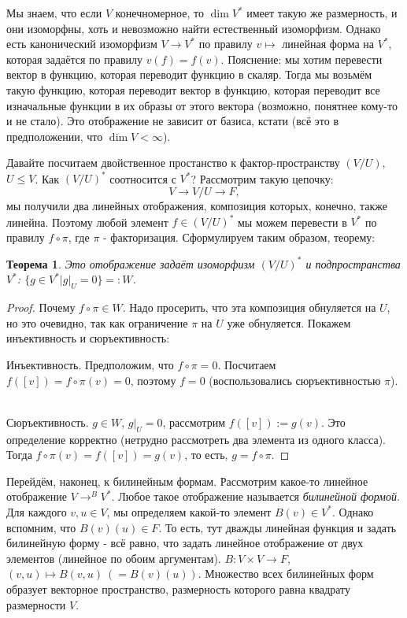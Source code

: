 \documentclass[a4paper,100pt]{article}
\theoremstyle{indented}
\newtheorem{theorem}{Теорема}
\theoremstyle{definition}
\theoremstyle{remark}
\begin{document}
Мы знаем, что если $V$ конечномерное, то $\dim V^*$ имеет такую же размерность, и они изоморфны, хоть и невозможно найти естественный изоморфизм. Однако есть канонический изоморфизм $V\rightarrow V^*$ по правилу $v\mapsto $ линейная форма на $V^*$, которая задаётся по правилу $v(f)=f(v)$. Пояснение: мы хотим перевести вектор в функцию, которая переводит функцию в скаляр. Тогда мы возьмём такую функцию, которая переводит вектор в функцию, которая переводит все изначальные функции в их образы от этого вектора (возможно, понятнее кому-то и не стало). Это отображение не зависит от базиса, кстати (всё это в предположении, что $\dim V< \infty$). \ 

Давайте посчитаем двойственное простанство к фактор-пространству $(V/U)$, $U\leq V$. Как $(V/U)^*$ соотносится с $V^*$? Рассмотрим такую цепочку: 
\[
    V \rightarrow V/U \rightarrow F,
\]
мы получили два линейных отображения, композиция которых, конечно, также линейна. Поэтому любой элемент $f\in(V/U)^*$ мы можем перевести в $V^*$ по правилу $f\circ\pi$, где $\pi$ - факторизация. Сформулируем таким образом, теорему: \\

\begin{theorem}
    Это отображение задаёт изоморфизм $(V/U)^*$ и подпространства $V^*$: $\{g\in V^*|g|_U=0\}=:W$. 
\end{theorem}

\begin{proof}
    Почему $f\circ \pi \in W$. Надо просерить, что эта композиция обнуляется на $U$, но это очевидно, так как ограничение $\pi$ на $U$ уже обнуляется. Покажем инъективность и сюръективность: \ 

    Инъективность. Предположим, что $f\circ \pi =0$. Посчитаем $f([v])=f\circ \pi(v)=0$, поэтому $f=0$ (воспользовались сюръективностью $\pi$). \ 

    Сюръективность. $g\in W$, $g|_U=0$, рассмотрим $f([v]):=g(v)$. Это определение корректно (нетрудно рассмотреть два элемента из одного класса). Тогда $f\circ \pi(v)=f([v])=g(v)$, то есть, $g=f\circ \pi$. 
\end{proof}

Перейдём, наконец, к билинейным формам. Рассмотрим какое-то линейное отображение $V\rightarrow^B V^*$. Любое такое отображение называется \textit{билинейной формой}. Для каждого $v, u\in V$, мы определяем какой-то элемент $B(v)\in V^*$. Однако вспомним, что $B(v)(u)\in F$. То есть, тут дважды линейная функция и задать билинейную форму - всё равно, что задать линейное отображение от двух элементов (линейное по обоим аргументам). $B: V\times V\rightarrow F$, $(v, u)\mapsto B(v, u)\: (=B(v)(u))$. Множество всех билинейных форм образует векторное пространство, размерность которого равна квадрату размерности $V$. \ 
\end{document}
